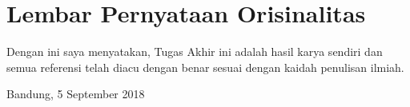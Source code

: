 \chapter*{Lembar Pernyataan Orisinalitas}
\vspace{15mm}

Dengan ini saya menyatakan, Tugas Akhir ini adalah hasil karya sendiri dan semua referensi telah diacu dengan benar sesuai dengan kaidah penulisan ilmiah.
\vspace{15mm}

Bandung, 5 September 2018 \\
\\
\\
\\
\\
\theauthor
